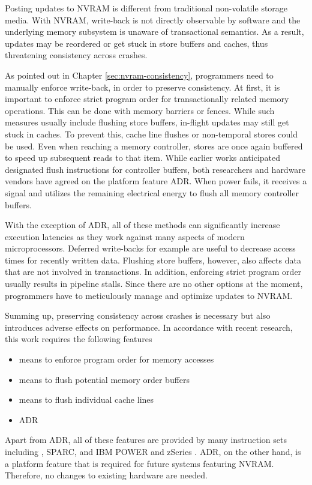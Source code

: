 Posting updates to NVRAM is different from traditional non-volatile storage
media. With NVRAM, write-back is not directly observable by software and the
underlying memory subsystem is unaware of transactional semantics. As a result,
updates may be reordered or get stuck in store buffers and caches, thus
threatening consistency across crashes.

As pointed out in Chapter \ref{sec:nvram-consistency}, programmers need to
manually enforce write-back, in order to preserve consistency. At first, it is
important to enforce strict program order for transactionally related memory
operations. This can be done with memory barriers or fences. While such measures
usually include flushing store buffers, in-flight updates may still get stuck in
caches. To prevent this, cache line flushes or non-temporal stores could be
used. Even when reaching a memory controller, stores are once again buffered to
speed up subsequent reads to that item. While earlier works anticipated
designated flush instructions for controller buffers, both researchers and
hardware vendors have agreed on the platform feature ADR. When power fails, it
receives a signal and utilizes the remaining electrical energy to flush all
memory controller buffers.

With the exception of ADR, all of these methods can significantly increase
execution latencies as they work against many aspects of modern microprocessors.
Deferred write-backs for example are useful to decrease access times for
recently written data. Flushing store buffers, however, also affects data that
are not involved in transactions. In addition, enforcing strict program order
usually results in pipeline stalls. Since there are no other options at the
moment, programmers have to meticulously manage and optimize updates to NVRAM.

Summing up, preserving consistency across crashes is necessary but also
introduces adverse effects on performance. In accordance with recent research,
this work requires the following features

\begin{itemize}
    \item means to enforce program order for memory accesses
    \item means to flush potential memory order buffers
    \item means to flush individual cache lines
    \item ADR
\end{itemize}

Apart from ADR, all of these features are provided by many instruction sets
including , SPARC, and IBM POWER and zSeries
\cite{mckenney2007memory}. ADR, on the other hand, is a platform feature that is
required for future systems featuring NVRAM. Therefore, no changes to existing
hardware are needed.
